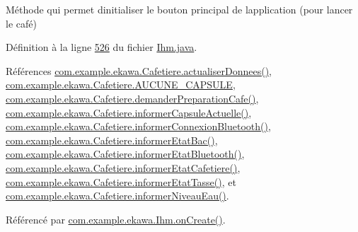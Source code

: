 Méthode qui permet d\textquotesingle{}initialiser le bouton principal de l\textquotesingle{}application (pour lancer le café) 



Définition à la ligne \hyperlink{_ihm_8java_source_l00526}{526} du fichier \hyperlink{_ihm_8java_source}{Ihm.\+java}.



Références \hyperlink{_cafetiere_8java_source_l00495}{com.\+example.\+ekawa.\+Cafetiere.\+actualiser\+Donnees()}, \hyperlink{_cafetiere_8java_source_l00028}{com.\+example.\+ekawa.\+Cafetiere.\+A\+U\+C\+U\+N\+E\+\_\+\+C\+A\+P\+S\+U\+LE}, \hyperlink{_cafetiere_8java_source_l00397}{com.\+example.\+ekawa.\+Cafetiere.\+demander\+Preparation\+Cafe()}, \hyperlink{_cafetiere_8java_source_l00235}{com.\+example.\+ekawa.\+Cafetiere.\+informer\+Capsule\+Actuelle()}, \hyperlink{_cafetiere_8java_source_l00275}{com.\+example.\+ekawa.\+Cafetiere.\+informer\+Connexion\+Bluetooth()}, \hyperlink{_cafetiere_8java_source_l00295}{com.\+example.\+ekawa.\+Cafetiere.\+informer\+Etat\+Bac()}, \hyperlink{_cafetiere_8java_source_l00265}{com.\+example.\+ekawa.\+Cafetiere.\+informer\+Etat\+Bluetooth()}, \hyperlink{_cafetiere_8java_source_l00255}{com.\+example.\+ekawa.\+Cafetiere.\+informer\+Etat\+Cafetiere()}, \hyperlink{_cafetiere_8java_source_l00285}{com.\+example.\+ekawa.\+Cafetiere.\+informer\+Etat\+Tasse()}, et \hyperlink{_cafetiere_8java_source_l00305}{com.\+example.\+ekawa.\+Cafetiere.\+informer\+Niveau\+Eau()}.



Référencé par \hyperlink{_ihm_8java_source_l00248}{com.\+example.\+ekawa.\+Ihm.\+on\+Create()}.


